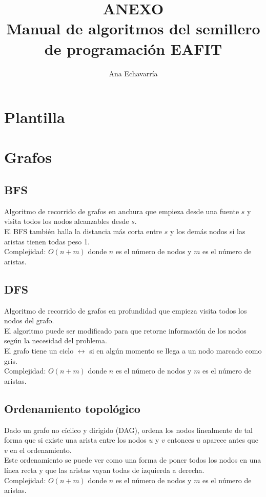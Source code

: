 \documentclass[10pt,letterpaper,twocolumn]{article}
\newcommand{\source}[1]{
	
	\dotfill
}
\begin{document}
\title{ANEXO\\Manual de algoritmos del semillero de programación EAFIT}
\author{Ana Echavarría}
\date{}
\maketitle

\tableofcontents

\section{Plantilla}
	\source{./src/template.cpp}

\section{Grafos}

	\subsection{BFS}
		Algoritmo de recorrido de grafos en anchura que empieza desde una fuente $s$ y visita todos los nodos alcanzables desde $s$.\\
		El BFS también halla la distancia más corta entre $s$ y los demás nodos si las aristas tienen todas peso 1.\\
		Complejidad: $O(n+m)$ donde $n$ es el número de nodos y $m$ es el número de aristas.\\
		\source{./src/bfs.cpp}
		
	\subsection{DFS}
		Algoritmo de recorrido de grafos en profundidad que empieza visita todos los nodos del grafo.\\
		El algoritmo puede ser modificado para que retorne información de los nodos según la necesidad del problema.\\
		El grafo tiene un ciclo $\leftrightarrow$ si en algún momento se llega a un nodo marcado como gris.\\
		Complejidad: $O(n+m)$ donde $n$ es el número de nodos y $m$ es el número de aristas.\\
		\source{./src/dfs.cpp}
		
	\subsection{Ordenamiento topológico}
		Dado un grafo no cíclico y dirigido (DAG), ordena los nodos linealmente de tal forma que si existe una arista entre los nodos $u$ y $v$ entonces $u$ aparece antes que $v$ en el ordenamiento.\\
		Este ordenamiento se puede ver como una forma de poner todos los nodos en una línea recta y que las aristas vayan todas de izquierda a derecha.\\
		Complejidad: $O(n+m)$ donde $n$ es el número de nodos y $m$ es el número de aristas.\\
		\source{./src/ordenamiento_topologico.cpp}
		
\end{document}
